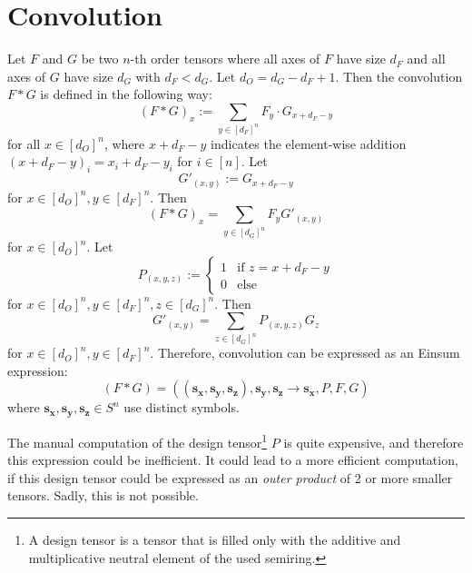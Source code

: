 \section{Convolution}
\label{sec:translating_inference:convolution}

Let $F$ and $G$ be two $n$-th order tensors where all axes of $F$ have size $d_F$ and all axes of $G$ have size $d_G$ with $d_F < d_G$.
Let $d_O = d_G - d_F + 1$.
Then the convolution $F * G$ is defined in the following way:
$$(F * G)_x := \sum\limits_{y \in [d_F]^n} F_y \cdot G_{x + d_F - y}$$
for all $x \in [d_O]^n$, where $x + d_F - y$ indicates the element-wise addition $(x + d_F - y)_i = x_i + d_F - y_i$ for $i \in [n]$.
Let
$$G'_{(x, y)} := G_{x + d_F - y}$$
for $x \in [d_O]^n, y \in [d_F]^n$.
Then
$$(F * G)_x = \sum\limits_{y \in [d_G]^n} F_y G'_{(x, y)}$$
for $x \in [d_O]^n$.
Let
$$P_{(x, y, z)} := \begin{cases}
        1 & \text{if } z = x + d_F - y \\
        0 & \text{else}
    \end{cases}$$
for $x \in [d_O]^n, y \in [d_F]^n, z \in [d_G]^n$.
Then
$$G'_{(x, y)} = \sum\limits_{z \in [d_G]^n} P_{(x, y, z)} G_z$$
for $x \in [d_O]^n, y \in [d_F]^n$.
Therefore, convolution can be expressed as an Einsum expression:
$$(F * G) = ((\bm{s_x},\bm{s_y},\bm{s_z}),\bm{s_y}, \bm{s_z}  \rightarrow \bm{s_x}, P, F, G)$$
where $\bm{s_x},\bm{s_y},\bm{s_z} \in S^n$ use distinct symbols.

The manual computation of the design tensor\footnote{A design tensor is a tensor that is filled only with the additive and multiplicative neutral element of the used semiring.} $P$ is quite expensive, and therefore this expression could be inefficient.
It could lead to a more efficient computation, if this design tensor could be expressed as an \textit{outer product} of 2 or more smaller tensors.
Sadly, this is not possible.

